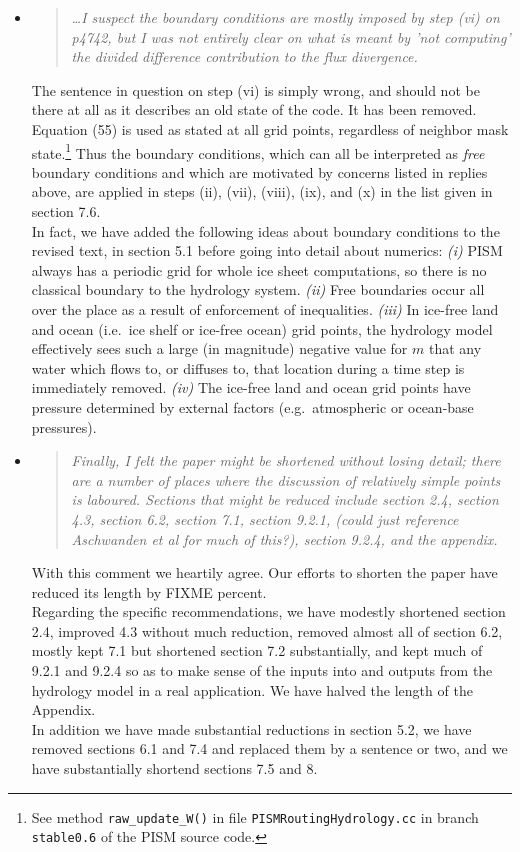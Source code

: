 \documentclass[11pt,reqno]{amsart}
\newcommand{\reply}[2]{
\medskip\medskip
\item  \begin{quote}
\emph{#1}
\end{quote}

\medskip
\noindent #2}
\begin{document}
\begin{itemize}
\reply{ \dots  I suspect the boundary conditions are mostly imposed by step (vi) on p4742, but I was not entirely clear on what is meant by 'not computing' the divided difference contribution to the flux divergence.}
{The sentence in question on step (vi) is simply wrong, and should not be there at all as it describes an old state of the code.  It has been removed.  \\
\indent Equation (55) is used as stated at all grid points, regardless of neighbor mask state.\footnote{See method \texttt{raw\_update\_W()} in file \texttt{PISMRoutingHydrology.cc} in branch \texttt{stable0.6} of the PISM source code.}  Thus the boundary conditions, which can all be interpreted as \emph{free} boundary conditions and which are motivated by concerns listed in replies above, are applied in steps (ii), (vii), (viii), (ix), and (x) in the list given in section 7.6. \\
\indent In fact, we have added the following ideas about boundary conditions to the revised text, in section 5.1 before going into detail about numerics: \emph{(i)} PISM always has a periodic grid for whole ice sheet computations, so there is no classical boundary to the hydrology system.  \emph{(ii)} Free boundaries occur all over the place as a result of enforcement of inequalities.  \emph{(iii)} In ice-free land and ocean (i.e.~ice shelf or ice-free ocean) grid points, the hydrology model effectively sees such a large (in magnitude) negative value for $m$ that any water which flows to, or diffuses to, that location during a time step is immediately removed.  \emph{(iv)} The ice-free land and ocean grid points have pressure determined by external factors (e.g.~atmospheric or ocean-base pressures).}

\reply{Finally, I felt the paper might be shortened without losing detail; there are a number of places where the discussion of relatively simple points is laboured. Sections that might be reduced include section 2.4, section 4.3, section 6.2, section 7.1, section 9.2.1, (could just reference Aschwanden et al for much of this?), section 9.2.4, and the appendix.}
{With this comment we heartily agree.  Our efforts to shorten the paper have reduced its length by FIXME percent.\\
\indent Regarding the specific recommendations, we have modestly shortened section 2.4, improved 4.3 without much reduction, removed almost all of section 6.2, mostly kept 7.1 but shortened section 7.2 substantially, and kept much of 9.2.1 and 9.2.4 so as to make sense of the inputs into and outputs from the hydrology model in a real application.  We have halved the length of the Appendix. \\
\indent In addition we have made substantial reductions in section 5.2, we have removed sections 6.1 and 7.4 and replaced them by a sentence or two, and we have substantially shortend sections 7.5 and 8.}


\end{itemize}
\end{document}
